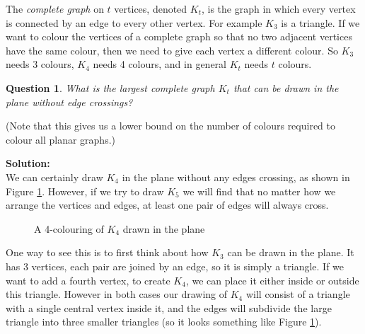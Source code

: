 \documentclass[12pt]{article}
\newtheorem{question}{Question}
\newif\iffullversion
\begin{document}
The \emph{complete graph} on $t$ vertices, denoted $K_t$, is the graph in which every vertex is connected by an edge to every other vertex. For example $K_3$ is a triangle. If we want to colour the vertices of a complete graph so that no two adjacent vertices have the same colour, then we need to give each vertex a different colour. So $K_3$ needs 3 colours, $K_4$ needs 4 colours, and in general $K_t$ needs $t$ colours. 
\begin{question}
What is the largest complete graph $K_t$ that can be drawn in the plane without edge crossings?
\end{question}
(Note that this gives us a lower bound on the number of colours required to colour all planar graphs.)

\iffullversion
\textbf{Solution:\\}
We can certainly draw $K_4$ in the plane without any edges crossing, as shown in Figure \ref{K4}. However, if we try to draw $K_5$ we will find that no matter how we arrange the vertices and edges, at least one pair of edges will always cross. 
\begin{figure}[h]
\begin{center}
\end{center}
\caption{A 4-colouring of $K_4$ drawn in the plane}\label{K4}
\end{figure}
One way to see this is to first think about how $K_3$ can be drawn in the plane. It has 3 vertices, each pair are joined by an edge, so it is simply a triangle. If we want to add a fourth vertex, to create $K_4$, we can place it either inside or outside this triangle. However in both cases our drawing of $K_4$ will consist of a triangle with a single central vertex inside it, and the edges will subdivide the large triangle into three smaller triangles (so it looks something like Figure \ref{K4}).
\end{document}

